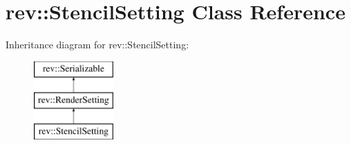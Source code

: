 \hypertarget{classrev_1_1_stencil_setting}{}\section{rev\+::Stencil\+Setting Class Reference}
\label{classrev_1_1_stencil_setting}
Inheritance diagram for rev\+::Stencil\+Setting\+:\begin{figure}[H]
\begin{center}
\leavevmode
\includegraphics[height=3.000000cm]{classrev_1_1_stencil_setting}
\end{center}
\end{figure}
